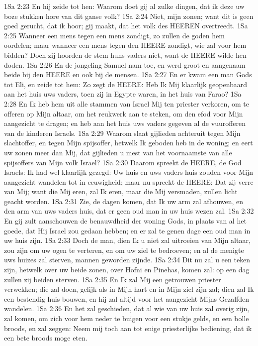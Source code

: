 1Sa 2:23  En hij zeide tot hen: Waarom doet gij al zulke dingen, dat ik deze uw boze stukken hore van dit ganse volk?
1Sa 2:24  Niet, mijn zonen; want dit is geen goed gerucht, dat ik hoor; gij maakt, dat het volk des HEEREN overtreedt.
1Sa 2:25  Wanneer een mens tegen een mens zondigt, zo zullen de goden hem oordelen; maar wanneer een mens tegen den HEERE zondigt, wie zal voor hem bidden? Doch zij hoorden de stem huns vaders niet, want de HEERE wilde hen doden.
1Sa 2:26  En de jongeling Samuel nam toe, en werd groot en aangenaam beide bij den HEERE en ook bij de mensen.
1Sa 2:27  En er kwam een man Gods tot Eli, en zeide tot hem: Zo zegt de HEERE: Heb Ik Mij klaarlijk geopenbaard aan het huis uws vaders, toen zij in Egypte waren, in het huis van Farao?
1Sa 2:28  En Ik heb hem uit alle stammen van Israel Mij ten priester verkoren, om te offeren op Mijn altaar, om het reukwerk aan te steken, om den efod voor Mijn aangezicht te dragen; en heb aan het huis uws vaders gegeven al de vuurofferen van de kinderen Israels.
1Sa 2:29  Waarom slaat gijlieden achteruit tegen Mijn slachtoffer, en tegen Mijn spijsoffer, hetwelk Ik geboden heb in de woning; en eert uw zonen meer dan Mij, dat gijlieden u mest van het voornaamste van alle spijsoffers van Mijn volk Israel?
1Sa 2:30  Daarom spreekt de HEERE, de God Israels: Ik had wel klaarlijk gezegd: Uw huis en uws vaders huis zouden voor Mijn aangezicht wandelen tot in eeuwigheid; maar nu spreekt de HEERE: Dat zij verre van Mij; want die Mij eren, zal Ik eren, maar die Mij versmaden, zullen licht geacht worden.
1Sa 2:31  Zie, de dagen komen, dat Ik uw arm zal afhouwen, en den arm van uws vaders huis, dat er geen oud man in uw huis wezen zal.
1Sa 2:32  En gij zult aanschouwen de benauwdheid der woning Gods, in plaats van al het goede, dat Hij Israel zou gedaan hebben; en er zal te genen dage een oud man in uw huis zijn.
1Sa 2:33  Doch de man, dien Ik u niet zal uitroeien van Mijn altaar, zou zijn om uw ogen te verteren, en om uw ziel te bedroeven; en al de menigte uws huizes zal sterven, mannen geworden zijnde.
1Sa 2:34  Dit nu zal u een teken zijn, hetwelk over uw beide zonen, over Hofni en Pinehas, komen zal: op een dag zullen zij beiden sterven.
1Sa 2:35  En Ik zal Mij een getrouwen priester verwekken; die zal doen, gelijk als in Mijn hart en in Mijn ziel zijn zal; dien zal Ik een bestendig huis bouwen, en hij zal altijd voor het aangezicht Mijns Gezalfden wandelen.
1Sa 2:36  En het zal geschieden, dat al wie van uw huis zal overig zijn, zal komen, om zich voor hem neder te buigen voor een stukje gelds, en een bolle broods, en zal zeggen: Neem mij toch aan tot enige priesterlijke bediening, dat ik een bete broods moge eten.
